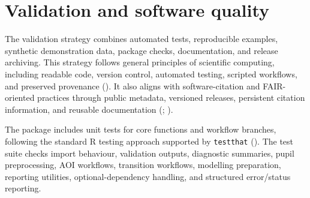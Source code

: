 \documentclass[
]{article}
\begin{document}
\section{Validation and software
quality}\label{validation-and-software-quality}

The validation strategy combines automated tests, reproducible examples,
synthetic demonstration data, package checks, documentation, and release
archiving. This strategy follows general principles of scientific
computing, including readable code, version control, automated testing,
scripted workflows, and preserved provenance
(). It also aligns with
software-citation and FAIR-oriented practices through public metadata,
versioned releases, persistent citation information, and reusable
documentation (;
).

The package includes unit tests for core functions and workflow
branches, following the standard R testing approach supported by
\texttt{testthat} ().
The test suite checks import behaviour, validation outputs, diagnostic
summaries, pupil preprocessing, AOI workflows, transition workflows,
modelling preparation, reporting utilities, optional-dependency
handling, and structured error/status reporting.
\end{document}
